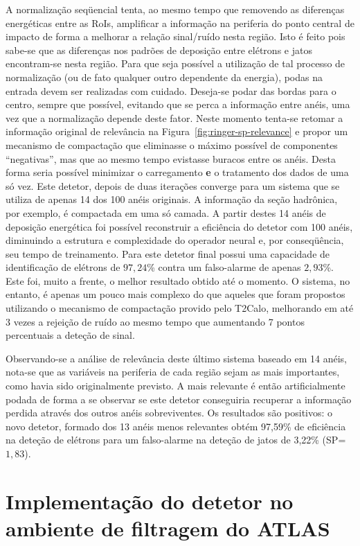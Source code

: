 A normalização seqüencial tenta, ao mesmo tempo que removendo as diferenças
energéticas entre as RoIs, amplificar a informação na periferia do ponto
central de impacto de forma a melhorar a relação sinal/ruído nesta
região. Isto é feito pois sabe-se que as diferenças nos padrões de deposição
entre elétrons e jatos encontram-se nesta região. Para que seja possível a
utilização de tal processo de normalização (ou de fato qualquer outro
dependente da energia), podas na entrada devem ser realizadas com
cuidado. Deseja-se podar das bordas para o centro, sempre que possível,
evitando que se perca a informação entre anéis, uma vez que a normalização
depende deste fator. Neste momento tenta-se retomar a informação original de
relevância na Figura~\ref{fig:ringer-sp-relevance} e propor um mecanismo de
compactação que eliminasse o máximo possível de componentes ``negativas'', mas
que ao mesmo tempo evistasse buracos entre os anéis. Desta forma seria
possível minimizar o carregamento \textbf{e} o tratamento dos dados de uma só
vez. Este detetor, depois de duas iterações converge para um sistema que se
utiliza de apenas 14 dos 100 anéis originais. A informação da seção hadrônica,
por exemplo, é compactada em uma só camada. A partir destes 14 anéis de
deposição energética foi possível reconstruir a eficiência do detetor com 100
anéis, diminuindo a estrutura e complexidade do operador neural e, por
conseqüência, seu tempo de treinamento. Para este detetor final possui uma
capacidade de identificação de elétrons de $97,24$\% contra um falso-alarme de
apenas $2,93$\%. Este foi, muito a frente, o melhor resultado obtido até o
momento. O sistema, no entanto, é apenas um pouco mais complexo do que aqueles
que foram propostos utilizando o mecanismo de compactação provido pelo T2Calo,
melhorando em até 3 vezes a rejeição de ruído ao mesmo tempo que aumentando 7
pontos percentuais a deteção de sinal.

Observando-se a análise de relevância deste último sistema baseado em 14
anéis, nota-se que as variáveis na periferia de cada região sejam as mais
importantes, como havia sido originalmente previsto. A mais relevante é então
artificialmente podada de forma a se observar se este detetor conseguiria
recuperar a informação perdida através dos outros anéis sobreviventes. Os
resultados são positivos: o novo detetor, formado dos 13 anéis menos
relevantes obtém 97,59\% de eficiência na deteção de elétrons para um
falso-alarme na deteção de jatos de 3,22\% (SP=$1,83$).

\section{Implementação do detetor no ambiente de filtragem do ATLAS}

